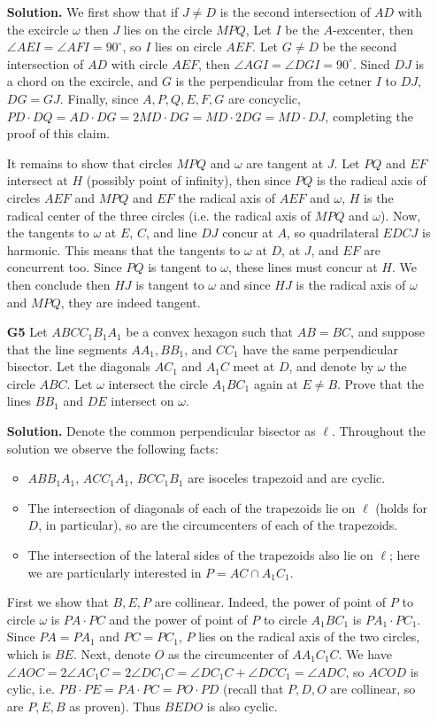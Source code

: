 \documentclass[11pt,a4paper]{article}
\begin{document}
\begin{enumerate}
	\textbf{Solution.} We first show that if $J\neq D$ is the second intersection of $AD$ with the excircle $\omega$ then $J$ lies on the circle $MPQ$, Let $I$ be the $A$-excenter, then $\angle AEI=\angle AFI=90^{\circ}$, so $I$ lies on circle $AEF$. Let $G\neq D$ be the second intersection of $AD$ with circle $AEF$, then $\angle AGI=\angle DGI=90^{\circ}$. Sincd $DJ$ is a chord on the excircle, and $G$ is the perpendicular from the cetner $I$ to $DJ$, $DG=GJ$. Finally, since $A, P, Q, E, F, G$ are concyclic, $PD\cdot DQ=AD\cdot DG=2MD\cdot DG=MD\cdot 2DG=MD\cdot DJ$, completing the proof of this claim. 
	
	It remains to show that circles $MPQ$ and $\omega$ are tangent at $J$. Let $PQ$ and $EF$ intersect at $H$ (possibly point of infinity), then since $PQ$ is the radical axis of circles $AEF$ and $MPQ$ and $EF$ the radical axis of $AEF$ and $\omega$, $H$ is the radical center of the three circles (i.e. the radical axis of $MPQ$ and $\omega$). Now, the tangents to $\omega$ at $E$, $C$, and line $DJ$ concur at $A$, so quadrilateral $EDCJ$ is harmonic. This means that the tangents to $\omega$ at $D$, at $J$, and $EF$ are concurrent too. Since $PQ$ is tangent to $\omega$, these lines must concur at $H$. We then conclude then $HJ$ is tangent to $\omega$ and since $HJ$ is the radical axis of $\omega$ and $MPQ$, they are indeed tangent. 
	
	\item[\textbf{G5}] Let $ABCC_1B_1A_1$ be a convex hexagon such that $AB=BC$, and suppose that the line segments $AA_1, BB_1$, and $CC_1$ have the same perpendicular bisector. Let the diagonals $AC_1$ and $A_1C$ meet at $D$, and denote by $\omega$ the circle $ABC$. Let $\omega$ intersect the circle $A_1BC_1$ again at $E \neq B$. Prove that the lines $BB_1$ and $DE$ intersect on $\omega$.
	
	\textbf{Solution.} Denote the common perpendicular bisector as $\ell$. Throughout the solution we observe the following facts: 
	\begin{itemize}
		\item $ABB_1A_1$, $ACC_1A_1$, $BCC_1B_1$ are isoceles trapezoid and are cyclic. 
		\item The intersection of diagonals of each of the trapezoids lie on $\ell$ (holds for $D$, in particular), so are the circumcenters of each of the trapezoids. 
		\item The intersection of the lateral sides of the trapezoids also lie on $\ell$; here we are particularly interested in $P=AC\cap A_1C_1$. 
	\end{itemize}
    First we show that $B, E, P$ are collinear. Indeed, the power of point of $P$ to circle $\omega$ is $PA\cdot PC$ and the power of point of $P$ to circle $A_1BC_1$ is $PA_1\cdot PC_1$. Since $PA=PA_1$ and $PC=PC_1$, $P$ lies on the radical axis of the two circles, which is $BE$. Next, denote $O$ as the circumcenter of $AA_1C_1C$. We have $\angle AOC=2\angle AC_1C=2\angle DC_1C=\angle DC_1C+\angle DCC_1=\angle ADC$, so $ACOD$ is cylic, i.e. $PB\cdot PE=PA\cdot PC=PO\cdot PD$ (recall that $P, D, O$ are collinear, so are $P, E, B$ as proven). Thus $BEDO$ is also cyclic. 
    

\end{enumerate}
\end{document}
